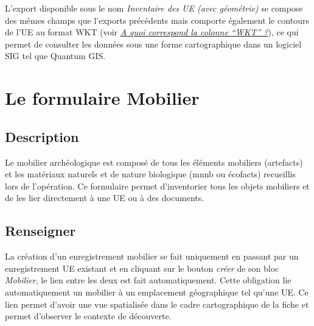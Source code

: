 \documentclass[letterpaper,10pt,french]{sphinxmanual}
\begin{document}
L'export disponible sous le nom \emph{Inventaire des UE (avec géométrie)} se compose des mêmes champs que l'exports précédents mais comporte également le contours de l'UE au format WKT (voir {\hyperref[manuel/questions_frequentes:def-wkt]{\emph{A quoi correspond la colonne ``WKT'' ?}}}), ce qui permet de consulter les données sous une forme cartographique dans un logiciel SIG tel que Quantum GIS.


\chapter{Le formulaire Mobilier}
\label{manuel/formulaire_mobilier:le-formulaire-mobilier}\label{manuel/formulaire_mobilier::doc}

\section{Description}
\label{manuel/formulaire_mobilier:description}
Le mobilier archéologique est composé de tous les éléments mobiliers (artefacts) et les matériaux naturels et de nature biologique (mnnb ou écofacts) recueillis lors de l’opération. Ce formulaire permet d'inventorier tous les objets mobiliers et de les lier directement à une UE ou à des documents.
\begin{figure}[htbp]
\centering

\end{figure}


\section{Renseigner}
\label{manuel/formulaire_mobilier:renseigner}
La création d'un enregistrement mobilier se fait uniquement en passant par un enregistrement UE existant et en cliquant sur le bouton \emph{créer} de son bloc \emph{Mobilier}, le lien entre les deux est fait automatiquement. Cette obligation lie automatiquement un mobilier à un emplacement géographique tel qu'une UE. Ce lien permet d'avoir une vue spatialisée dans le cadre cartographique de la fiche et permet d'observer le contexte de découverte.
\end{document}
